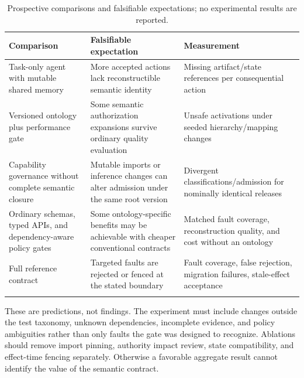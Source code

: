 \documentclass[preprint,12pt,authoryear]{elsarticle}
\begin{document}
\begin{table}[!htbp]\centering\footnotesize
\caption{Prospective comparisons and falsifiable expectations; no
experimental results are reported.}
\medskip
\begin{tabular}{@{}
  >{\raggedright\arraybackslash}p{}
  >{\raggedright\arraybackslash}p{}
  >{\raggedright\arraybackslash}p{}@{}}
\toprule\noalign{}
\begin{minipage}[b]{\linewidth}\raggedright
Comparison
\end{minipage} & \begin{minipage}[b]{\linewidth}\raggedright
Falsifiable expectation
\end{minipage} & \begin{minipage}[b]{\linewidth}\raggedright
Measurement
\end{minipage} \\
\midrule\noalign{}

Task-only agent with mutable shared memory & More accepted actions lack
reconstructible semantic identity & Missing artifact/state references
per consequential action \\
\addlinespace[4pt]
Versioned ontology plus performance gate & Some semantic authorization
expansions survive ordinary quality evaluation & Unsafe activations
under seeded hierarchy/mapping changes \\
\addlinespace[4pt]
Capability governance without complete semantic closure & Mutable
imports or inference changes can alter admission under the same root
version & Divergent classifications/admission for nominally identical
releases \\
\addlinespace[4pt]
Ordinary schemas, typed APIs, and dependency-aware policy gates & Some
ontology-specific benefits may be achievable with cheaper conventional
contracts & Matched fault coverage, reconstruction quality, and cost
without an ontology \\
\addlinespace[4pt]
Full reference contract & Targeted faults are rejected or fenced at the
stated boundary & Fault coverage, false rejection, migration failures,
stale-effect acceptance \\
\addlinespace[4pt]
\bottomrule
\end{tabular}
\end{table}


These are predictions, not findings. The experiment must include changes
outside the test taxonomy, unknown dependencies, incomplete evidence,
and policy ambiguities rather than only faults the gate was designed to
recognize. Ablations should remove import pinning, authority impact
review, state compatibility, and effect-time fencing separately.
Otherwise a favorable aggregate result cannot identify the value of the
semantic contract.
\end{document}

